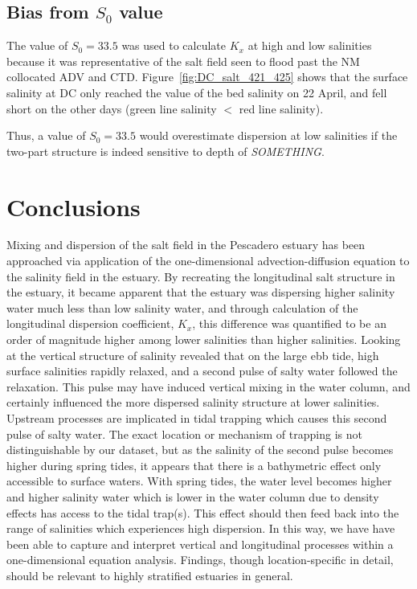 \subsection{Bias from $S_0$ value}
The value of $S_0 = 33.5$ was used to calculate $K_x$ at high and low salinities because it was representative of the salt field seen to flood past the NM collocated ADV and CTD. Figure~\ref{fig:DC_salt_421_425} shows that the surface salinity at DC only reached the value of the bed salinity on 22 April, and fell short on the other days (green line salinity $<$ red line salinity). 


Thus, a value of $S_0 = 33.5$ would overestimate dispersion at low salinities if the two-part structure is indeed sensitive to depth of \emph{SOMETHING}. 


\section{Conclusions}

Mixing and dispersion of the salt field in the Pescadero estuary has been approached via application of the one-dimensional advection-diffusion equation to the salinity field in the estuary. By recreating the longitudinal salt structure in the estuary, it became apparent that the estuary was dispersing higher salinity water much less than low salinity water, and through calculation of the longitudinal dispersion coefficient, $K_x$, this difference was quantified to be an order of magnitude higher among lower salinities than higher salinities. Looking at the vertical structure of salinity revealed that on the large ebb tide, high surface salinities rapidly relaxed, and a second pulse of salty water followed the relaxation. This pulse may have induced vertical mixing in the water column, and certainly influenced the more dispersed salinity structure at lower salinities. 
Upstream processes are implicated in tidal trapping which causes this second pulse of salty water.  The exact location or mechanism of trapping is not distinguishable by our dataset, but as the salinity of the second pulse becomes higher during spring tides, it appears that there is a bathymetric effect only accessible to surface waters. With spring tides, the water level becomes higher and higher salinity water which is lower in the water column due to density effects has access to the tidal trap(s). This effect should then feed back into the range of salinities which experiences high dispersion. 
In this way, we have have been able to capture and interpret vertical and longitudinal processes within a one-dimensional equation analysis. Findings, though location-specific in detail, should be relevant to highly stratified estuaries in general. 


